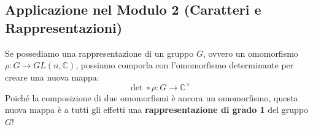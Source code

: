 \subsection*{Applicazione nel Modulo 2 (Caratteri e Rappresentazioni)}
Se possediamo una rappresentazione di un gruppo $G$, ovvero un omomorfismo $\rho: G \to GL(n, \mathbb{C})$, possiamo comporla con l'omomorfismo determinante per creare una nuova mappa:
$$ \det \circ \rho: G \to \mathbb{C}^\times $$
Poiché la composizione di due omomorfismi è ancora un omomorfismo, questa nuova mappa è a tutti gli effetti una \textbf{rappresentazione di grado 1} del gruppo $G$!
% 
